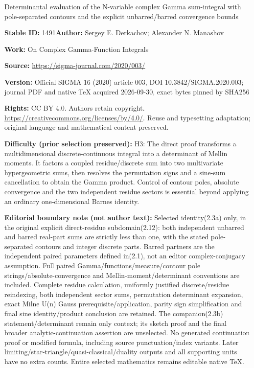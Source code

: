 \documentclass[11pt]{article}
\numberwithin{equation}{section}
\numberwithin{equation}{section}
\begin{document}
\begin{center}\Large Determinantal evaluation of the N-variable complex Gamma sum-integral with pole-separated contours and the explicit unbarred/barred convergence bounds\end{center}
\noindent\textbf{Stable ID:} 1491\quad\textbf{Author:} Sergey E. Derkachov; Alexander N. Manashov\par
\noindent\textbf{Work:} On Complex Gamma-Function Integrals\par
\noindent\textbf{Source:} \url{https://sigma-journal.com/2020/003/}\par
\noindent\textbf{Version:} Official SIGMA 16 (2020) article 003, DOI 10.3842/SIGMA.2020.003; journal PDF and native TeX acquired 2026-09-30, exact bytes pinned by SHA256\par
\noindent\textbf{Rights:} CC BY 4.0. Authors retain copyright. \url{https://creativecommons.org/licenses/by/4.0/}. Reuse and typesetting adaptation; original language and mathematical content preserved.\par
\noindent\textbf{Difficulty (prior selection preserved):} {\CJKfont H3: The direct proof transforms a multidimensional discrete-continuous integral into a determinant of Mellin moments. It factors a coupled residue/discrete sum into two multivariate hypergeometric sums, then resolves the permutation signs and a sine-sum cancellation to obtain the Gamma product. Control of contour poles, absolute convergence and the two independent residue sectors is essential beyond applying an ordinary one-dimensional Barnes identity.}\par
\medskip\noindent\textbf{Editorial boundary note (not author text):} Selected identity(2.3a) only, in the original explicit direct-residue subdomain(2.12): both independent unbarred and barred real-part sums are strictly less than one, with the stated pole-separated contours and integer discrete parts. Barred partners are the independent paired parameters defined in(2.1), not an editor complex-conjugacy assumption. Full paired Gamma/functions/measure/contour pole strings/absolute-convergence and Mellin-moment/determinant conventions are included. Complete residue calculation, uniformly justified discrete/residue reindexing, both independent sector sums, permutation determinant expansion, exact Milne U(n) Gauss prerequisite/application, parity sign simplification and final sine identity/product conclusion are retained. The companion(2.3b) statement/determinant remain only context; its sketch proof and the final broader analytic-continuation assertion are unselected. No generated continuation proof or modified formula, including source punctuation/index variants. Later limiting/star-triangle/quasi-classical/duality outputs and all supporting units have no extra counts. Entire selected mathematics remains editable native TeX.\par
\end{document}
